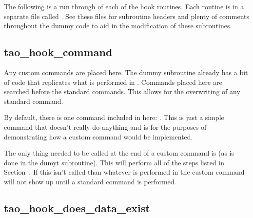 The following is a run through of each of the hook routines. Each
routine is in a separate file called
. See these files for subroutine
headers and plenty of comments throughout the dummy code to aid in the
modification of these subroutines.

\subsection{tao\_hook\_command}

Any custom commands are placed here. The dummy subroutine already has
a bit of code that replicates what is performed in
. Commands placed here are searched before the
standard \tao commands. This allows for the overwriting of any
standard \tao command.

By default, there is one command included in here: . This
is just a simple command that doesn't really do anything and is for
the purposes of demonstrating how a custom command would be
implemented.

The only thing needed to be called at the end of a custom command is
 (as is done in the dumyt subroutine). This will
perform all of the steps listed in Section~. If this
isn't called than whatever is performed in the custom command will not
show up until a standard command is performed.

\subsection{tao\_hook\_does\_data\_exist}

